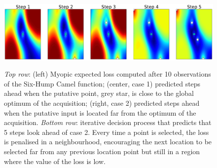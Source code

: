 \documentclass[twoside]{article}
\begin{document}
\begin{figure}[t!]
\begin{center}\label{fig:steps_ahead}
\includegraphics[width=15cm]{steps.pdf}
\end{center}\caption{\emph{Top row}: (left) Myopic expected loss computed after 10 observations of the Six-Hump Camel function; (center, case 1) predicted steps ahead when the putative point, grey star, is close to the global optimum of the acquisition; (right, case 2) predicted steps ahead when the putative input is located far from the optimum of the acquisition. \emph{Bottom row}: iterative decision process that predicts that 5 steps look ahead of case 2. Every time a point is selected, the loss is penalised in a neighbourhood, encouraging the next location to be selected far from any previous location point but still in a region where the value of the loss is low.}
\end{figure}
\end{document}
